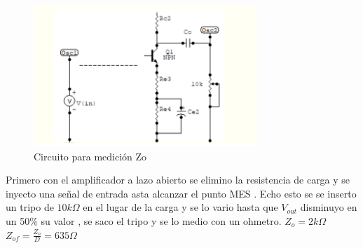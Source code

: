 \documentclass[12pt, letterpaper]{article}
\begin{document}
\singlespacing
\begin{figure}[H]
	\centering
	\includegraphics[width=0.75\textwidth]{Imagenes/zo.png}

	\caption{Circuito para medición Zo}
	\label{fig:med_Zo}
\end{figure}
Primero con el amplificador a lazo abierto se elimino la resistencia de carga y se inyecto una señal de entrada asta alcanzar el punto MES . Echo esto se se inserto un tripo de $10k\Omega$ en el lugar de la carga y se lo vario hasta que $V_{out}$ disminuyo en un 50\% su valor , se saco el tripo y se lo medio con un ohmetro.
\singlespacing
$Z_o=2k\Omega$
\singlespacing
$Z_{of}=\frac{Z_o}{D}=635\Omega$
\singlespacing
\end{document}
